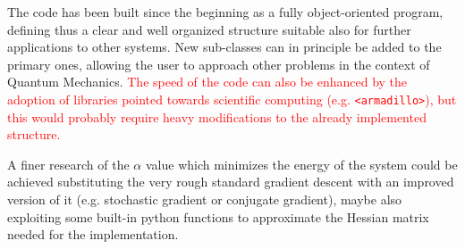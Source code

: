 The code has been built since the beginning as a fully object-oriented program, defining thus a clear and well organized structure suitable also for further applications to other systems. New sub-classes can in principle be added to the primary ones, allowing the user to approach other problems in the context of Quantum Mechanics. \textcolor{red}{The speed of the code can also be enhanced by the adoption of libraries pointed towards scientific computing (e.g. \texttt{<armadillo>}), but this would probably require heavy modifications to the already implemented structure.} 

A finer research of the $\alpha$ value which minimizes the energy of the system could be achieved substituting the very rough standard gradient descent with an improved version of it (e.g. stochastic gradient or conjugate gradient), maybe also exploiting some built-in python functions to approximate the Hessian matrix needed for the implementation. 

